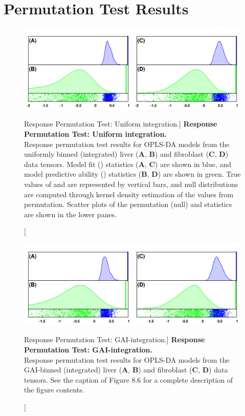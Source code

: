 \section{Permutation Test Results}

\begin{figure}[ht!]
\includegraphics[width=6.5in]{figs/gaibin/06-perm-unif-int.png}
\caption
      [Response Permutation Test: Uniform integration.]{
  {\bf Response Permutation Test: Uniform integration.}
  \\
  Response permutation test results for OPLS-DA models from the uniformly
  binned (integrated) liver ({\bf A}, {\bf B}) and fibroblast
  ({\bf C}, {\bf D}) data tensors. Model fit (\rsqy{}) statistics
  ({\bf A}, {\bf C}) are shown in blue, and model predictive ability (\qsq{})
  statistics ({\bf B}, {\bf D}) are shown in green. True values of \rsqy{} and
  \qsq{} are represented by vertical bars, and null distributions are computed
  through kernel density estimation of the values from permutation. Scatter
  plots of the permutation (null) \rsqy{} and \qsq{} statistics are shown in
  the lower panes.
}
\label{figure.8.6}
\end{figure}

\begin{figure}[ht!]
\includegraphics[width=6.5in]{figs/gaibin/07-perm-gai-int.png}
\caption
      [Response Permutation Test: GAI-integration.]{
  {\bf Response Permutation Test: GAI-integration.}
  \\
  Response permutation test results for OPLS-DA models from the GAI-binned
  (integrated) liver ({\bf A}, {\bf B}) and fibroblast
  ({\bf C}, {\bf D}) data tensors. See the caption of Figure 8.6 for a
  complete description of the figure contents.
}
\label{figure.8.7}
\end{figure}

